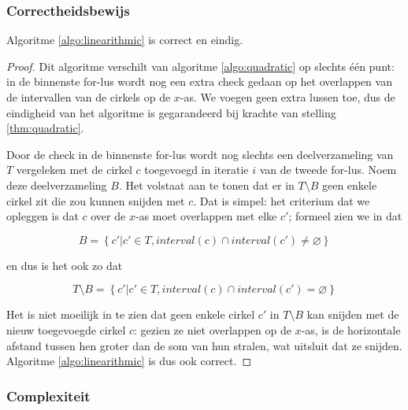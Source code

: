 \subsubsection{Correctheidsbewijs}
\begin{stl} Algoritme \ref{algo:linearithmic} is correct en eindig.\end{stl}
\begin{proof}
Dit algoritme verschilt van algoritme \ref{algo:quadratic} op slechts
één punt: in de binnenste for-lus wordt nog een extra check gedaan op
het overlappen van de intervallen van de cirkels op de $x$-as. We
voegen geen extra lussen toe, dus de eindigheid van het algoritme is
gegarandeerd bij krachte van stelling \ref{thm:quadratic}.

Door de check in de binnenste for-lus wordt nog slechts een
deelverzameling van $T$ vergeleken met de cirkel $c$ toegevoegd in
iteratie $i$ van de tweede for-lus. Noem deze deelverzameling $B$. Het
volstaat aan te tonen dat er in $T \setminus B$ geen enkele cirkel zit die zou
kunnen snijden met $c$. Dat is simpel: het criterium dat we opleggen
is dat $c$ over de $x$-as moet overlappen met elke $c'$; formeel zien
we in dat 

\[B = \left\{c' | c' \in T, interval(c) \cap interval(c') \neq \varnothing \right\} \]

en dus is het ook zo dat

\[T \setminus B = \left\{c' | c' \in T, interval(c) \cap interval(c') = \varnothing \right\} \]

Het is niet moeilijk in te zien dat geen enkele cirkel $c'$ in $T
\setminus B$ kan snijden met de nieuw toegevoegde cirkel $c$: gezien
ze niet overlappen op de $x$-as, is de horizontale afstand tussen hen
groter dan de som van hun stralen, wat uitsluit dat ze
snijden. Algoritme \ref{algo:linearithmic} is dus ook correct.
\end{proof}

\subsubsection{Complexiteit}

